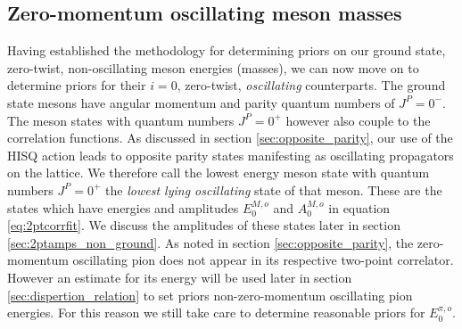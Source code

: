 

\subsection{Zero-momentum oscillating meson masses}\label{sec:oscillating_mass_priors}
Having established the methodology for determining priors on our ground state, zero-twist, non-oscillating meson energies (masses), we can now move on to determine priors for their $i=0$, zero-twist, \textit{oscillating} counterparts.  The ground state mesons have angular momentum and parity quantum numbers of $J^P = 0^-$.  The meson states with quantum numbers $J^P = 0^+$ however also couple to the correlation functions.  As discussed in section \ref{sec:opposite_parity}, our use of the HISQ action \cite{HISQ:2006rc} leads to opposite parity states manifesting as oscillating propagators on the lattice.  We therefore call the lowest energy meson state with quantum numbers $J^P = 0^+$ the \textit{lowest lying oscillating} state of that meson. These are the states which have energies and amplitudes $E_0^{M,o}$ and $A_0^{M,o}$ in equation \ref{eq:2ptcorrfit}.  We discuss the amplitudes of these states later in section \ref{sec:2ptamps_non_ground}. As noted in section \ref{sec:opposite_parity}, the zero-momentum oscillating pion does not appear in its respective two-point correlator.  However an estimate for its energy will be used later in section \ref{sec:dispertion_relation} to set priors non-zero-momentum oscillating pion energies.  For this reason we still take care to determine reasonable priors for $E_{0}^{\pi,o}$.

